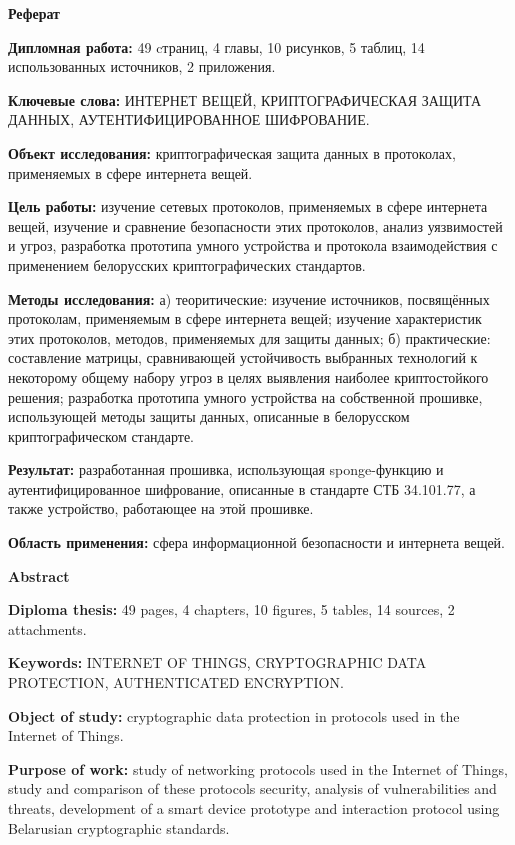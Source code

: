 \newpage
\begin{center}{\bf \Large Реферат}\end{center}
  
\textbf{Дипломная работа:} 49 cтраниц, 4 главы, 10 рисунков, 5 таблиц, 14 использованных источников,
2 приложения.

\textbf{Ключевые слова:} ИНТЕРНЕТ ВЕЩЕЙ, КРИПТОГРАФИЧЕСКАЯ ЗАЩИТА ДАННЫХ, 
АУТЕНТИФИЦИРОВАННОЕ ШИФРОВАНИЕ.

\textbf{Объект исследования:} криптографическая защита данных в протоколах, применяемых в сфере 
интернета вещей.

\textbf{Цель работы:} изучение сетевых протоколов, применяемых в сфере интернета вещей, изучение
и сравнение безопасности этих протоколов, анализ уязвимостей и угроз, разработка прототипа умного
устройства и протокола взаимодействия с применением белорусских криптографических стандартов.

\textbf{Методы исследования:} а) теоритические: изучение источников, посвящённых протоколам,
применяемым в сфере интернета вещей; изучение характеристик этих протоколов, методов, применяемых
для защиты данных; б) практические: составление матрицы, сравнивающей устойчивость выбранных 
технологий к некоторому общему набору угроз в целях выявления наиболее криптостойкого решения;
разработка прототипа умного устройства на собственной прошивке, использующей методы защиты
данных, описанные в белорусском криптографическом стандарте.

\textbf{Результат:} разработанная прошивка, использующая sponge-функцию и аутентифицированное
шифрование, описанные в стандарте СТБ 34.101.77, а также устройство, работающее на этой прошивке.

\textbf{Область применения:} сфера информационной безопасности и интернета вещей.


\newpage
\begin{center}{\bf \Large Abstract}\end{center}

\textbf{Diploma thesis:} 49 pages, 4 chapters, 10 figures, 5 tables, 14 sources, 2 attachments.

\textbf{Keywords:} INTERNET OF THINGS, CRYPTOGRAPHIC DATA \newline PROTECTION, 
AUTHENTICATED ENCRYPTION.

\textbf{Object of study:} cryptographic data protection in protocols used in the Internet of Things.

\textbf{Purpose of work:} study of networking protocols used in the Internet of Things, study and 
comparison of these protocols security, analysis of vulnerabilities and threats, development 
of a smart device prototype and interaction protocol using Belarusian cryptographic standards.

